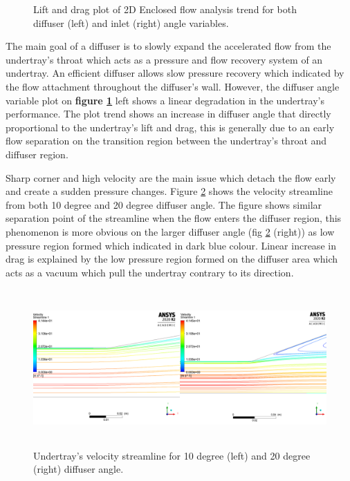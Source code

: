 \begin{figure}[!ht]
  \noindent
  \caption{Lift and drag plot of 2D Enclosed flow analysis trend for both diffuser (left) and inlet (right) angle variables. }
  \label{fig:2D_EN_result}
\end{figure}

\noindent The main goal of a diffuser is to slowly expand the accelerated flow from the undertray's throat which acts as a pressure and flow recovery system of an undertray. An efficient diffuser allows slow pressure recovery which indicated by the flow attachment throughout the diffuser's wall. However, the diffuser angle variable plot on \textbf{figure \ref{fig:2D_EN_result}} left shows a linear degradation in the undertray's performance. The plot trend shows an increase in diffuser angle that directly proportional to the undertray's lift and drag, this is generally due to an early flow separation on the transition region between the undertray's throat and diffuser region. 

\noindent Sharp corner and high velocity are the main issue which detach the flow early and create a sudden pressure changes. Figure \ref{fig:2D_EN_streamline_compare} shows the velocity streamline from both 10 degree and 20 degree diffuser angle. The figure shows similar separation point of the streamline when the flow enters the diffuser region, this phenomenon is more obvious on the larger diffuser angle (fig \ref{fig:2D_EN_streamline_compare} (right)) as low pressure region formed which indicated in dark blue colour. Linear increase in drag is explained by the low pressure region formed on the diffuser area which acts as a vacuum which pull the undertray contrary to its direction.  

\begin{figure}[!h]
    \centering
    \includegraphics[height= 6cm]{Figures/2D_EN/2D_EN_Streamline_compare.PNG}
    \caption{Undertray's velocity streamline for 10 degree (left) and 20 degree (right) diffuser angle.}
    \label{fig:2D_EN_streamline_compare}
\end{figure}


